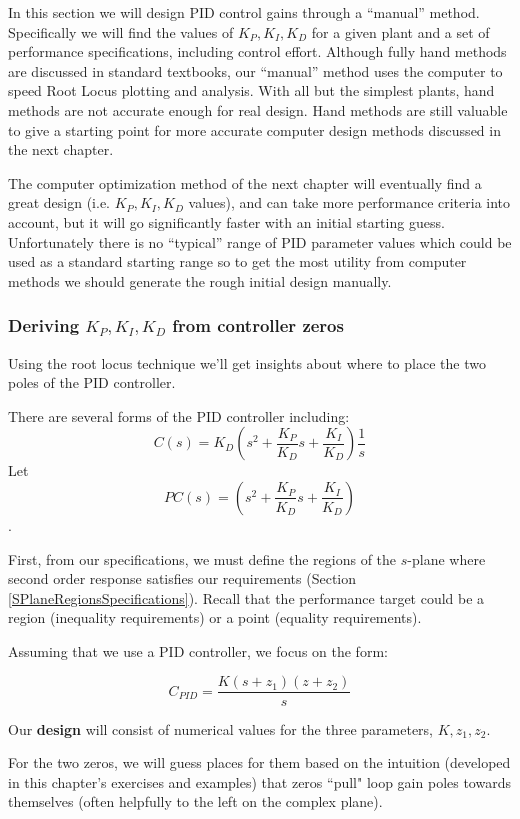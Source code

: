 In this section we will design PID control gains through a ``manual'' method.  Specifically we will find the values of $K_P, K_I, K_D$ for a given plant and a set of performance specifications, including control effort.  Although fully hand methods are discussed in standard textbooks, our ``manual'' method uses the computer to speed Root Locus plotting and analysis.   With all but the simplest plants, hand methods are not accurate enough for real design.  Hand methods are still valuable to give a starting point for more accurate computer design methods discussed in the next chapter.

The computer optimization method of the next chapter will eventually find a great design (i.e. $K_P,K_I,K_D$ values), and can take more performance criteria into account, but it will go significantly faster with an initial starting guess.   Unfortunately there is no ``typical'' range of PID parameter values which could be used as a standard starting range so to get the most utility from computer methods we should generate the rough initial design manually.


\subsubsection{Deriving $K_P, K_I, K_D$ from controller zeros}\label{Kpderive}

Using the root locus technique we'll get insights about where to place
the two poles of the PID controller.

There are several forms of the PID controller including:
\[
C(s) = K_D \left ( s^2+ \frac{K_P}{K_D}s + \frac{K_I}{K_D} \right ) \frac{1}{s}
\]
Let
\[
PC(s) = \left ( s^2+ \frac{K_P}{K_D}s + \frac{K_I}{K_D} \right )
\].

First, from our specifications, we must define the regions of the $s$-plane where second order
response satisfies our requirements (Section \ref{SPlaneRegionsSpecifications}).   Recall that
the performance target could be a region (inequality requirements) or a point (equality requirements).

Assuming that we use a PID controller, we focus on the form:

\[
C_{PID} = \frac {K(s+z_1)(z+z_2)}  {s}
\]

Our {\bf design} will consist of numerical values for the three parameters, $K, z_1, z_2$.

For the two zeros, we will guess places for them based on
the intuition (developed in this chapter's exercises and examples)
that zeros ``pull" loop gain poles towards themselves (often helpfully to the left on the complex plane).

